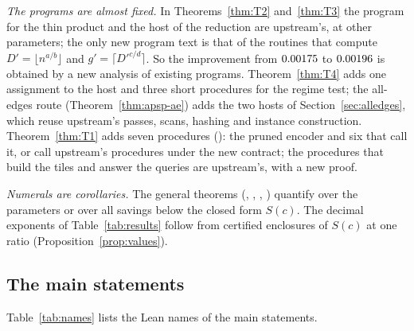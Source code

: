 \emph{The programs are almost fixed.}  In Theorems~\ref{thm:T2}
and~\ref{thm:T3} the program for the thin product and the host of the
reduction are upstream's, at other parameters; the only new program text is
that of the routines that compute \(D'=\lfloor n^{a/b}\rfloor\) and
\(g'=\lceil D'^{c/d}\rceil\).  So the improvement from \(0.00175\) to
\(0.00196\) is obtained by a new analysis of existing programs.
Theorem~\ref{thm:T4} adds one assignment to the host and three short
procedures for the regime test; the all-edges route (Theorem~\ref{thm:apsp-ae})
adds the two hosts of Section~\ref{sec:alledges}, which reuse upstream's
passes, scans, hashing and instance construction.  Theorem~\ref{thm:T1} adds
seven procedures (): the pruned encoder and six that call it,
or call upstream's procedures under the new contract; the procedures that
build the tiles and answer the queries are upstream's, with a new proof.

\emph{Numerals are corollaries.}  The general theorems
(, , ,
) quantify over the parameters or over all savings
below the closed form \(S(c)\).  The decimal exponents of
Table~\ref{tab:results} follow from certified enclosures of \(S(c)\) at one
ratio (Proposition~\ref{prop:values}).

\subsection{The main statements}

Table~\ref{tab:names} lists the Lean names of the main statements.

